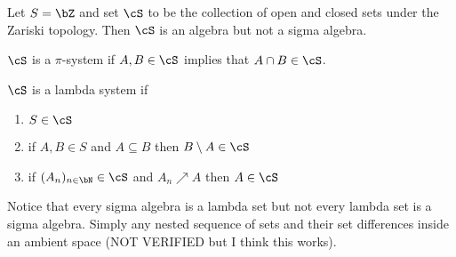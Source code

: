 \begin{example}\label{example:algebra-not-sigma}
  Let $S = \bZ$ and set $\cS$ to be the collection of open and closed sets under the Zariski topology. Then $\cS$ is an algebra but not a sigma algebra.
\end{example}
\begin{defn}\label{defn:pi-system}
  $\cS$ is a $\pi$-system if $A, B \in \cS$ implies that $A\cap B \in \cS$.
\end{defn}
\begin{defn}\label{defn:labmda-system}
  $\cS$ is a lambda system if
  \begin{enumerate}[(1)]
    \item $S \in \cS$
    \item if $A,B \in S$ and $A\subseteq B$ then $B \setminus A \in \cS$
    \item if $(A_n)_{n \in \bN}\in \cS$ and $A_n \nearrow A$ then $A\in \cS$
  \end{enumerate}
\end{defn}
Notice that every sigma algebra is a lambda set but not every lambda set is a sigma algebra. Simply any nested sequence of sets and their set differences inside an ambient space (NOT VERIFIED but I think this works).

\bigskip

